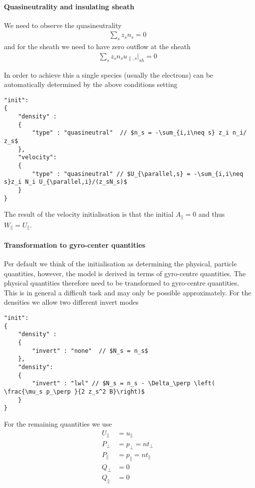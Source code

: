 \paragraph{Quasineutrality and insulating sheath}
We need to observe the quasineutrality
\begin{align}
\sum_s z_s n_s = 0
\end{align}
and for the sheath we need to have zero outflow at the sheath
\begin{align}
\sum_s z_s n_s u_{\parallel,s}|_{sh} = 0
\end{align}

In order to achieve this a single species (usually the electrons) can be automatically determined by the
above conditions setting
\begin{verbatim}
"init":
{
    "density" :
    {
        "type" : "quasineutral"  // $n_s = -\sum_{i,i\neq s} z_i n_i/ z_s$
    },
    "velocity":
    {
        "type" : "quasineutral" // $U_{\parallel,s} = -\sum_{i,i\neq s}z_i N_i U_{\parallel,i}/(z_sN_s)$
    }
}
\end{verbatim}
The result of the velocity initialisation is that the initial $A_\parallel=0$ and thus $W_\parallel = U_\parallel$.


\paragraph{Transformation to gyro-center quantities}
Per default we think of the initialisation as determining the physical, particle quantities, however, the
model is derived in terms of gyro-centre quantities.
The physical quantities therefore need to be transformed to gyro-centre quantities. This is in general a
difficult task and may only be possible approximately.
For the densities we allow two different invert modes
\begin{verbatim}
"init":
{
    "density" :
    {
        "invert" : "none"  // $N_s = n_s$
    },
    "density":
    {
        "invert" : "lwl" // $N_s = n_s - \Delta_\perp \left( \frac{\mu_s p_\perp }{2 z_s^2 B}\right)$
    }
}
\end{verbatim}
For the remaining quantities we use
\begin{align}
U_\parallel &= u_\parallel\\
P_\perp &= p_\perp = n t_\perp \\
P_\parallel &= p_\parallel = n t_\parallel\\
Q_\perp &= 0 \\
Q_\parallel &= 0
\end{align}


